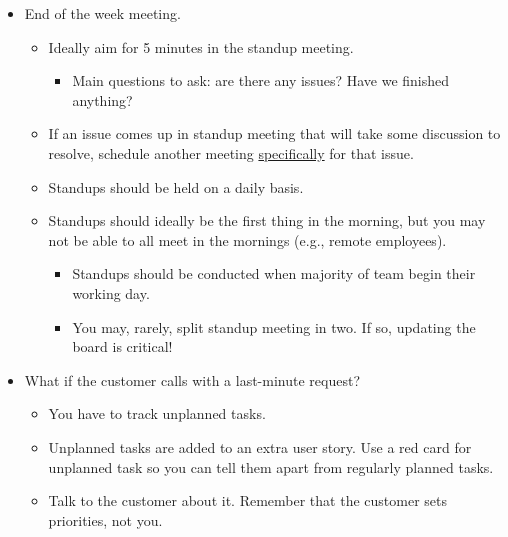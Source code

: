 \documentclass[letterpaper]{article}
\begin{document}
\begin{itemize}
    \item End of the week meeting. 
    \begin{itemize}
        \item Ideally aim for 5 minutes in the standup meeting. 
        \begin{itemize}
            \item Main questions to ask: are there any issues? Have we finished anything? 
        \end{itemize}

        \item If an issue comes up in standup meeting that will take some discussion to resolve, schedule another meeting \underline{specifically} for that issue.
        \item Standups should be held on a daily basis. 
        \item Standups should ideally be the first thing in the morning, but you may not be able to all meet in the mornings (e.g., remote employees). 
        \begin{itemize}
            \item Standups should be conducted when majority of team begin their working day. 
            \item You may, rarely, split standup meeting in two. If so, updating the board is critical! 
        \end{itemize}
    \end{itemize}

    \item What if the customer calls with a last-minute request? 
    \begin{itemize}
        \item You have to track unplanned tasks. 
        \item Unplanned tasks are added to an extra user story. Use a red card for unplanned task so you can tell them apart from regularly planned tasks. 
        \item Talk to the customer about it. Remember that the customer sets priorities, not you. 
    \end{itemize}
\end{itemize}
\end{document}
